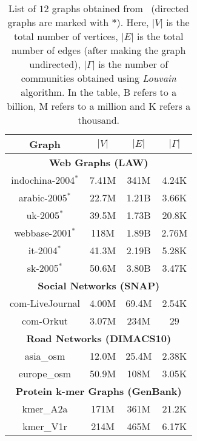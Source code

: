 \begin{table}[hbtp]
  \centering
  \caption{List of $12$ graphs obtained from~\cite{suite19} (directed graphs are marked with $*$). Here, $|V|$ is the total number of vertices, $|E|$ is the total number of edges (after making the graph undirected), $|\Gamma|$ is the number of communities obtained using \textit{Louvain} algorithm. In the table, B refers to a billion, M refers to a million and K refers a thousand.}
  \label{tab:dataset}
  \begin{tabular}{|c||c|c|c|}
    \toprule
    \textbf{Graph} &
    \textbf{\textbf{$|V|$}} &
    \textbf{\textbf{$|E|$}} &
    \textbf{\textbf{$|\Gamma|$}} \\
    \midrule
    \multicolumn{4}{|c|}{\textbf{Web Graphs (LAW)}} \\ \hline
    indochina-2004$^*$ & 7.41M & 341M & 4.24K \\ \hline  %
    arabic-2005$^*$ & 22.7M & 1.21B & 3.66K \\ \hline  %
    uk-2005$^*$ & 39.5M & 1.73B & 20.8K \\ \hline  %
    webbase-2001$^*$ & 118M & 1.89B & 2.76M \\ \hline  %
    it-2004$^*$ & 41.3M & 2.19B & 5.28K \\ \hline  %
    sk-2005$^*$ & 50.6M & 3.80B & 3.47K \\ \hline  %
    \multicolumn{4}{|c|}{\textbf{Social Networks (SNAP)}} \\ \hline
    com-LiveJournal & 4.00M & 69.4M & 2.54K \\ \hline  %
    com-Orkut & 3.07M & 234M & 29 \\ \hline  %
    \multicolumn{4}{|c|}{\textbf{Road Networks (DIMACS10)}} \\ \hline
    asia\_osm & 12.0M & 25.4M & 2.38K \\ \hline  %
    europe\_osm & 50.9M & 108M & 3.05K \\ \hline  %
    \multicolumn{4}{|c|}{\textbf{Protein k-mer Graphs (GenBank)}} \\ \hline
    kmer\_A2a & 171M & 361M & 21.2K \\ \hline  %
    kmer\_V1r & 214M & 465M & 6.17K \\ \hline  %
  \bottomrule
  \end{tabular}
\end{table}
